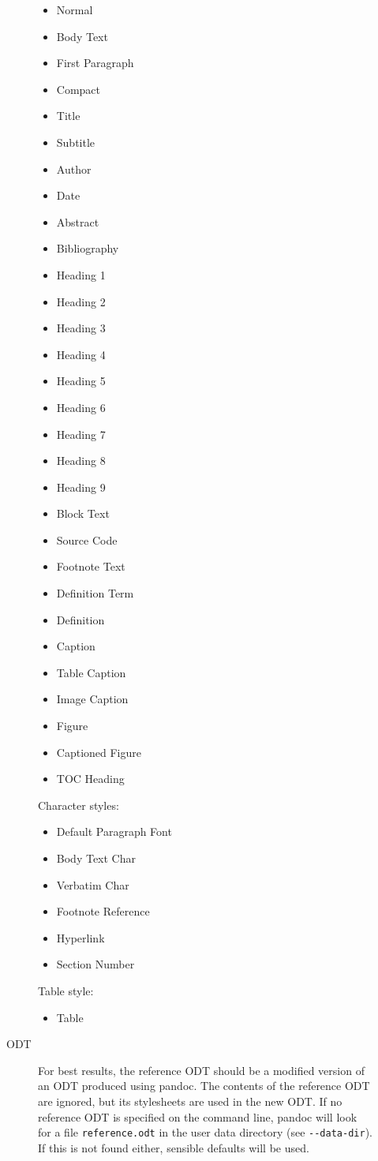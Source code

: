 \begin{description}
\begin{description}
\begin{itemize}
\tightlist
\item
  Normal
\item
  Body Text
\item
  First Paragraph
\item
  Compact
\item
  Title
\item
  Subtitle
\item
  Author
\item
  Date
\item
  Abstract
\item
  Bibliography
\item
  Heading 1
\item
  Heading 2
\item
  Heading 3
\item
  Heading 4
\item
  Heading 5
\item
  Heading 6
\item
  Heading 7
\item
  Heading 8
\item
  Heading 9
\item
  Block Text
\item
  Source Code
\item
  Footnote Text
\item
  Definition Term
\item
  Definition
\item
  Caption
\item
  Table Caption
\item
  Image Caption
\item
  Figure
\item
  Captioned Figure
\item
  TOC Heading
\end{itemize}

Character styles:

\begin{itemize}
\tightlist
\item
  Default Paragraph Font
\item
  Body Text Char
\item
  Verbatim Char
\item
  Footnote Reference
\item
  Hyperlink
\item
  Section Number
\end{itemize}

Table style:

\begin{itemize}
\tightlist
\item
  Table
\end{itemize}
\item[ODT]
For best results, the reference ODT should be a modified version of an
ODT produced using pandoc. The contents of the reference ODT are
ignored, but its stylesheets are used in the new ODT. If no reference
ODT is specified on the command line, pandoc will look for a file
\texttt{reference.odt} in the user data directory (see
\texttt{-\/-data-dir}). If this is not found either, sensible defaults
will be used.


\end{description}
\end{description}
